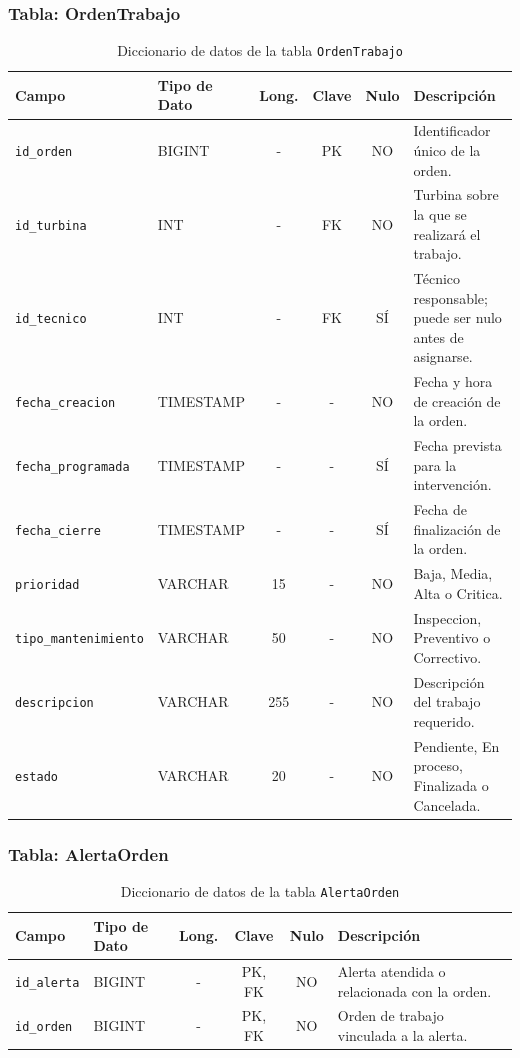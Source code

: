 \documentclass[11pt,a4paper]{article}
\begin{document}
\subsubsection{Tabla: OrdenTrabajo}
\begin{table}[H]
\centering
\small
\caption{Diccionario de datos de la tabla \texttt{OrdenTrabajo}}
\begin{tabular}{|l|l|c|c|c|p{5.1cm}|}
\hline
\textbf{Campo} & \textbf{Tipo de Dato} & \textbf{Long.} & \textbf{Clave} & \textbf{Nulo} & \textbf{Descripción} \\ \hline
\texttt{id\_orden} & BIGINT & - & PK & NO & Identificador único de la orden. \\ \hline
\texttt{id\_turbina} & INT & - & FK & NO & Turbina sobre la que se realizará el trabajo. \\ \hline
\texttt{id\_tecnico} & INT & - & FK & SÍ & Técnico responsable; puede ser nulo antes de asignarse. \\ \hline
\texttt{fecha\_creacion} & TIMESTAMP & - & - & NO & Fecha y hora de creación de la orden. \\ \hline
\texttt{fecha\_programada} & TIMESTAMP & - & - & SÍ & Fecha prevista para la intervención. \\ \hline
\texttt{fecha\_cierre} & TIMESTAMP & - & - & SÍ & Fecha de finalización de la orden. \\ \hline
\texttt{prioridad} & VARCHAR & 15 & - & NO & Baja, Media, Alta o Critica. \\ \hline
\texttt{tipo\_mantenimiento} & VARCHAR & 50 & - & NO & Inspeccion, Preventivo o Correctivo. \\ \hline
\texttt{descripcion} & VARCHAR & 255 & - & NO & Descripción del trabajo requerido. \\ \hline
\texttt{estado} & VARCHAR & 20 & - & NO & Pendiente, En proceso, Finalizada o Cancelada. \\ \hline
\end{tabular}
\end{table}

\subsubsection{Tabla: AlertaOrden}
\begin{table}[H]
\centering
\small
\caption{Diccionario de datos de la tabla \texttt{AlertaOrden}}
\begin{tabular}{|l|l|c|c|c|p{5.1cm}|}
\hline
\textbf{Campo} & \textbf{Tipo de Dato} & \textbf{Long.} & \textbf{Clave} & \textbf{Nulo} & \textbf{Descripción} \\ \hline
\texttt{id\_alerta} & BIGINT & - & PK, FK & NO & Alerta atendida o relacionada con la orden. \\ \hline
\texttt{id\_orden} & BIGINT & - & PK, FK & NO & Orden de trabajo vinculada a la alerta. \\ \hline
\end{tabular}
\end{table}
\end{document}
